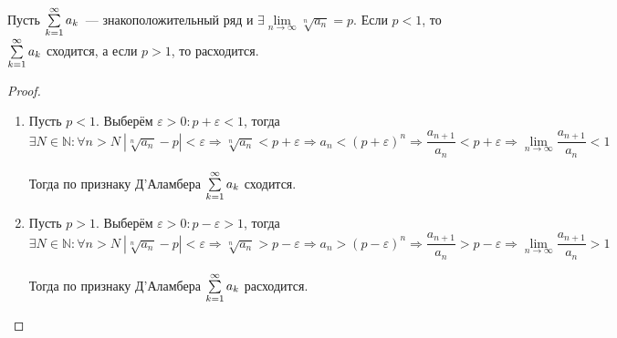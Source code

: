 \begin{theorem}
\label{th:Cauchy's_radical_test}
Пусть $\series a_k$~--- знакоположительный ряд и $\exists \lim\limits_{n \to \infty} \sqrt[n]{a_n} = p$.
Если $p < 1$, то $\series a_k$ сходится, а если $p > 1$, то расходится.
\end{theorem}
\begin{proof}
\begin{enumerate}
	\item Пусть $p < 1$.
	Выберём $\varepsilon > 0 \colon p + \varepsilon < 1$, тогда
	\begin{equation*}
	\exists N \in \mathbb N \colon \forall n > N \ \left| \sqrt[n]{a_n} - p \right| < \varepsilon \Rightarrow
	\sqrt[n]{a_n} < p + \varepsilon \Rightarrow
	a_n < (p + \varepsilon)^n \Rightarrow
	\frac{a_{n+1}}{a_n} < p + \varepsilon \Rightarrow
	\lim_{n \to \infty} \frac{a_{n+1}}{a_n} < 1
	\end{equation*}
	
	Тогда по признаку Д'Аламбера $\series a_k$ сходится.
	
	\item Пусть $p > 1$.
	Выберём $\varepsilon > 0 \colon p - \varepsilon > 1$, тогда
	\begin{equation*}
	\exists N \in \mathbb N \colon \forall n > N \ \left| \sqrt[n]{a_n} - p \right| < \varepsilon \Rightarrow
	\sqrt[n]{a_n} > p - \varepsilon \Rightarrow
	a_n > (p - \varepsilon)^n \Rightarrow
	\frac{a_{n+1}}{a_n} > p - \varepsilon \Rightarrow
	\lim_{n \to \infty} \frac{a_{n+1}}{a_n} > 1
	\end{equation*}
	
	Тогда по признаку Д'Аламбера $\series a_k$ расходится.
\end{enumerate}
\end{proof}

